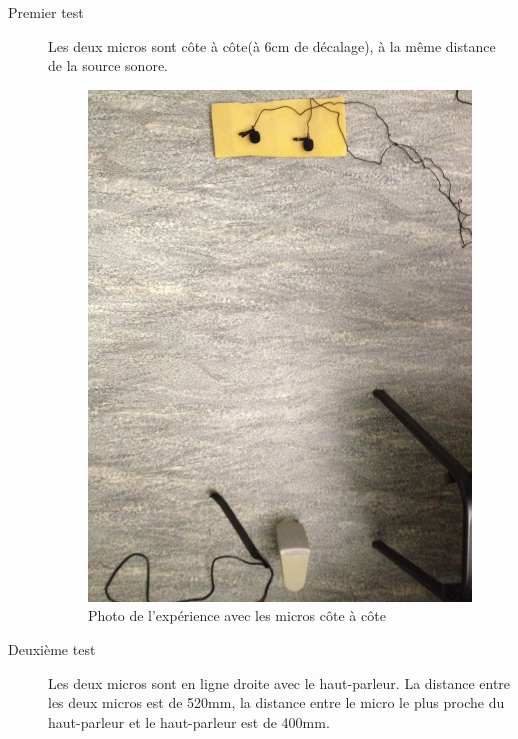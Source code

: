 \documentclass[12pt,a4paper]{report}
\begin{document}
\begin{description}
\item[Premier test] Les deux micros sont côte à côte(à 6cm de décalage), à la même distance de la source sonore.
	\begin{figure}[H]
	\includegraphics[width=\textwidth]{../donnees11-03/test_1.jpg} 
	\caption{Photo de l'expérience avec les micros côte à côte}
	\end{figure}
\item[Deuxième test] Les deux micros sont en ligne droite avec le haut-parleur. La distance entre les deux micros est de 520mm, la distance entre le micro le plus proche du haut-parleur et le haut-parleur est de 400mm.
	\begin{figure}[H]

\end{figure}
\end{description}
\end{document}
